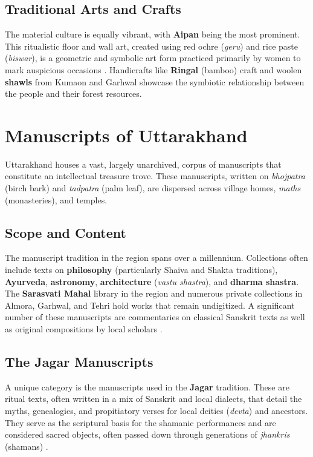 \documentclass[12pt]{article}
\begin{document}
\subsection{Traditional Arts and Crafts}
The material culture is equally vibrant, with \textbf{Aipan} being the most prominent. This ritualistic floor and wall art, created using red ochre (\textit{geru}) and rice paste (\textit{biswar}), is a geometric and symbolic art form practiced primarily by women to mark auspicious occasions \cite{naithani2016aipan}. Handicrafts like \textbf{Ringal} (bamboo) craft and woolen \textbf{shawls} from Kumaon and Garhwal showcase the symbiotic relationship between the people and their forest resources.

\section{Manuscripts of Uttarakhand}
Uttarakhand houses a vast, largely unarchived, corpus of manuscripts that constitute an intellectual treasure trove. These manuscripts, written on \textit{bhojpatra} (birch bark) and \textit{tadpatra} (palm leaf), are dispersed across village homes, \textit{maths} (monasteries), and temples.

\subsection{Scope and Content}
The manuscript tradition in the region spans over a millennium. Collections often include texts on \textbf{philosophy} (particularly Shaiva and Shakta traditions), \textbf{Ayurveda}, \textbf{astronomy}, \textbf{architecture} (\textit{vastu shastra}), and \textbf{dharma shastra}. The \textbf{Sarasvati Mahal} library in the region and numerous private collections in Almora, Garhwal, and Tehri hold works that remain undigitized. A significant number of these manuscripts are commentaries on classical Sanskrit texts as well as original compositions by local scholars \cite{sharma2012manuscript}.

\subsection{The Jagar Manuscripts}
A unique category is the manuscripts used in the \textbf{Jagar} tradition. These are ritual texts, often written in a mix of Sanskrit and local dialects, that detail the myths, genealogies, and propitiatory verses for local deities (\textit{devta}) and ancestors. They serve as the scriptural basis for the shamanic performances and are considered sacred objects, often passed down through generations of \textit{jhankris} (shamans) \cite{leavitt1997language}.
\end{document}
